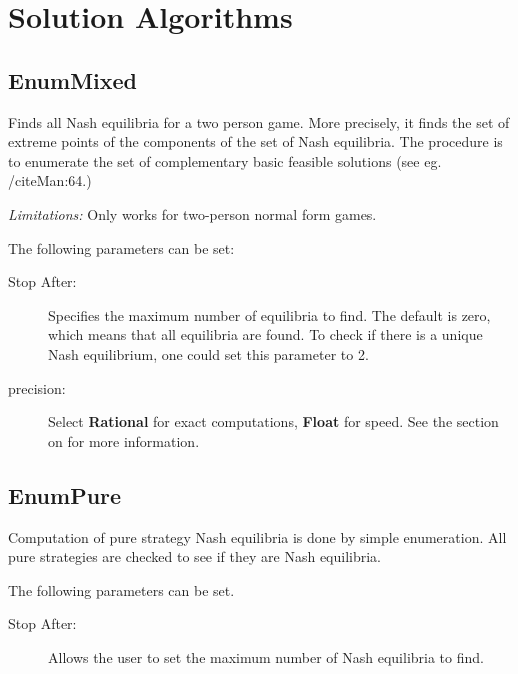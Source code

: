 \section{Solution Algorithms}\label{SolutionAlgorithms}

\subsection{EnumMixed}\label{EnumMixed}
Finds all Nash equilibria for a two person game.  More precisely, it
finds the set of extreme points of the components of the set of Nash
equilibria.  The procedure is to enumerate the set of complementary
basic feasible solutions (see eg. /cite{Man:64}.)

{\em Limitations:} Only works for two-person normal form games.

The following parameters can be set:

\begin{description}
\item[Stop After:] Specifies the maximum number of equilibria to find.  The
default is zero, which means that all equilibria are found.  To check if
there is a unique Nash equilibrium, one could set this parameter to 2.
\item[precision:] Select {\bf Rational} for exact computations, {\bf 
Float} for speed. See the section on 
for more information.
\end{description}

\subsection{EnumPure}\label{EnumPure}
Computation of pure strategy Nash equilibria is done by simple enumeration.
All pure strategies are checked to see if they are Nash equilibria.  

The following parameters can be set. 

\begin{description}
\item[Stop After:] Allows the user to set the maximum number of Nash
equilibria to find. 
\end{description}


